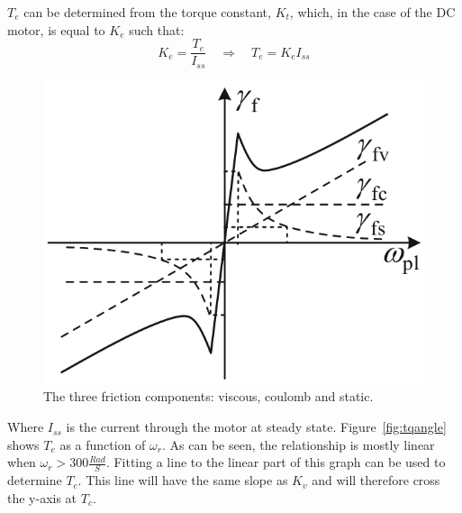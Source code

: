 $T_e$ can be determined from the torque constant, $K_t$, which, in the case of the DC motor, is equal to $K_e$ such that:
$$K_e = \frac{T_e}{I_{ss}} \quad \Rightarrow \quad T_e = K_eI_{ss}$$

\begin{figure}[!h]
	\centering
	\includegraphics[width=.5\linewidth]{graphics/friction}
	\caption[The three friction components]{The three friction components: viscous, coulomb and static.}
	\label{fig:friction}
\end{figure}

Where $I_{ss}$ is the current through the motor at steady state.
Figure~\ref{fig:tqangle} shows $T_e$ as a function of $\omega_r$.
As can be seen, the relationship is mostly linear when $\omega_r>300\frac{Rad}{S}$.
Fitting a line to the linear part of this graph can be used to determine $T_c$.
This line will have the same slope as $K_v$ and will therefore cross the y-axis at $T_c$.

